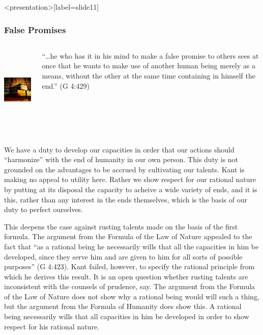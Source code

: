 \begin{frame}<presentation>[label=slide11]
    \frametitle{False Promises}
        \begin{columns}
            \begin{column}{4cm}
                \includegraphics[height=4cm]{../../graphics/false_promises.jpg}
            \end{column}
            \begin{column}{6cm}
                ``\ldots he who has it in his mind to make a false promise to others sees at once that he wants to make use of another human being merely as a means, without the other at the same time containing in himself the end.'' (G 4:429)
            \end{column}
        \end{columns}
\end{frame}

We have a duty to develop our capacities in order that our actions should ``harmonize'' with the end of humanity in our own person. This duty is not grounded on the advantages to be accrued by cultivating our talents. Kant is making no appeal to utility here. Rather we show respect for our rational nature by putting at its disposal the capacity to acheive a wide variety of ends, and it is this, rather than any interest in the ends themselves, which is the basis of our duty to perfect ourselves.

This deepens the case against rusting talents made on the basis of the first formula. The argument from the Formula of the Law of Nature appealed to the fact that ``as a rational being he necessarily wills that all the capacities in him be developed, since they serve him and are given to him for all sorts of possible purposes'' (G 4:423). Kant failed, however, to specify the rational principle from which he derives this result. It is an open question whether rusting talents are inconsistent with the counsels of prudence, say. The argument from the Formula of the Law of Nature does not show why a rational being would will such a thing, but the argument from the Formula of Humanity does show this. A rational being necessarily wills that all capacities in him be developed in order to show respect for his rational nature. \change

